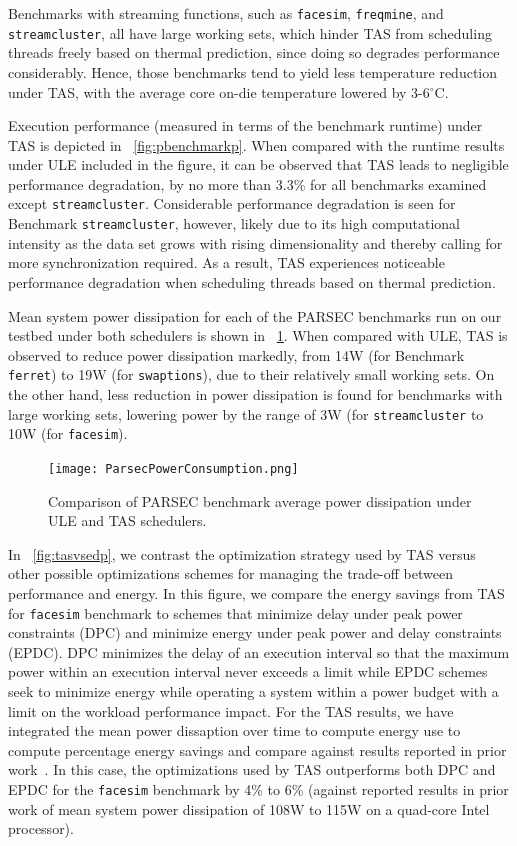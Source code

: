 \documentclass[times, 10pt,twocolumn]{IEEEtran}
\begin{document}
Benchmarks with streaming functions, such as \texttt{facesim},
\texttt{freqmine}, and \texttt{streamcluster}, all have large working
sets, which hinder TAS from scheduling threads freely based on thermal
prediction, since doing so degrades performance considerably.  Hence,
those benchmarks tend to yield less temperature reduction under TAS,
with the average core on-die temperature lowered by 3-6$^{\circ}$C.  

Execution performance (measured in terms of the benchmark runtime) under TAS 
is depicted in \figurename~\ref{fig:pbenchmarkp}.
When compared with the runtime results under ULE included in the figure,
it can be observed that TAS leads to negligible performance degradation,
by no more than 3.3\% for all benchmarks examined except \texttt{streamcluster}.
Considerable performance degradation is seen for Benchmark \texttt{streamcluster},
however, likely due to its high computational intensity as the data set
grows with rising dimensionality and thereby calling for
more synchronization required.
As a result, TAS experiences noticeable performance degradation
when scheduling threads based on thermal prediction.

Mean system power dissipation for each of the PARSEC benchmarks run on our testbed
under both schedulers is shown in \figurename~\ref{fig:pbenchmark}.
When compared with ULE, TAS is observed to reduce 
power dissipation markedly, from 14W (for Benchmark \texttt{ferret}) 
to 19W (for \texttt{swaptions}), due to their relatively small working sets.
On the other hand, less reduction in power dissipation is found for
benchmarks with large working sets, lowering power by the range of
3W (for \texttt{streamcluster} to 10W (for \texttt{facesim}). 
  
\begin{figure}[tbp]
  \texttt{[image: ParsecPowerConsumption.png]}
  \caption{Comparison of PARSEC benchmark average power dissipation under ULE and TAS schedulers.}
  \label{fig:pbenchmark}
\end{figure}

In \figurename~\ref{fig:tasvsedp}, we contrast the optimization strategy
used by TAS versus other possible optimizations schemes for managing the
trade-off between performance and energy.  In this figure, we compare
the energy savings from TAS for \texttt{facesim} benchmark to schemes
that minimize delay under peak power constraints (DPC) and minimize
energy under peak power and delay constraints (EPDC). DPC minimizes the
delay of an execution interval so that the maximum power within an
execution interval never exceeds a limit while EPDC schemes seek to
minimize energy while operating a system within a power budget with a
limit on the workload performance impact.  For the TAS results, we have
integrated the mean power dissaption over time to compute energy use to
compute percentage energy savings and compare against results reported
in prior work~\cite{Cochran2011}. In this case, the optimizations used
by TAS outperforms both DPC and EPDC for the \texttt{facesim} benchmark
by 4\% to 6\% (against reported results in prior work of mean system
power dissipation of 108W to 115W on a quad-core Intel processor).
\end{document}

